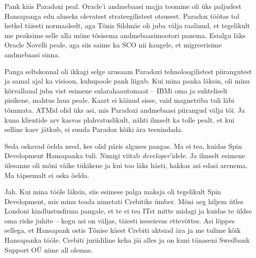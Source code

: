 Pank käis Paradoxi peal. Oracle'i andmebaasi majja 
toomine oli üks paljudest Hansapanga edu aluseks olevatest 
strateegilistest otsusest. Paradox 
töötas tol hetkel täiesti normaalselt, aga Tõnis 
Sildmäe oli juba välja raalinud, et tegelikult me 
peaksime selle alla mõne tõsisema andmebaasimootori panema. 
Esialgu läks Oracle Novelli peale, aga siis saime ka SCO 
nii kaugele, et migreerisime andmebaasi sinna.


Panga seltskonnal oli ikkagi selge arusaam Paradoxi 
tehnoloogilistest piirangutest ja samal ajal ka visioon, kuhupoole 
pank liigub. Kui mina panka läksin, 
oli minu kõrvallaual juba vist esimene sularahaautomaat -- IBMi oma ja
suhteliselt pisikene, mahtus laua peale. Kaart ei käinud 
sisse, vaid magnetriba tuli läbi tõmmata. ATMid olid 
üks asi, mis Paradoxi andmebaasi piirangud välja tõi. Ja kuna 
klientide arv kasvas plahvatuslikult, nähti ilmselt ka tolle pealt, et kui selline kasv jätkub, ei suuda
Paradox kõiki ära teenindada.


Seda oskavad öelda need, kes olid päris alguses pangas. Ma ei 
tea, kuidas Spin Development Hansapanka tuli. 
Nimigi viitab \emph{developer}'idele. Ja 
ilmselt esimene ülesanne oli mõni väike tükikene ja 
kui too läks hästi, hakkas asi edasi arenema. Ma täpsemalt ei oska öelda.


Jah. Kui mina tööle läksin, siis esimese palga maksja oli tegelikult Spin 
Development, mis minu teada nimetati 
Crebitiks ümber. Mõni aeg hiljem ütles Londoni 
kindlustusfirma pangale, et te ei tea ITst mitte midagi ja kuidas te üldse oma riske juhite -- kogu 
asi on väljas, täiesti iseseisvas ettevõttes. Asi lõppes sellega, et Hansapank ostis Tõnise käest 
Crebiti aktsiad ära ja me tulime kõik Hansapanka tööle. Crebiti 
juriidiline keha jäi alles ja on kuni tänaseni Swedbank Support OÜ nime 
all olemas.


